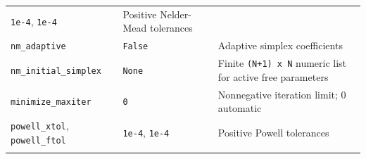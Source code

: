 \documentclass[
  10pt,
  a4paper,
  oneside]{scrreprt}
\begin{document}
\begin{longtable}[]{@{}lll@{}}
\begin{minipage}[t]{0.30\columnwidth}
\texttt{1e-4}, \texttt{1e-4}\strut
\end{minipage} & \begin{minipage}[t]{0.30\columnwidth}\raggedright
Positive Nelder-Mead tolerances\strut
\end{minipage}\tabularnewline
\begin{minipage}[t]{0.30\columnwidth}\raggedright
\texttt{nm\_adaptive}\strut
\end{minipage} & \begin{minipage}[t]{0.30\columnwidth}\raggedright
\texttt{False}\strut
\end{minipage} & \begin{minipage}[t]{0.30\columnwidth}\raggedright
Adaptive simplex coefficients\strut
\end{minipage}\tabularnewline
\begin{minipage}[t]{0.30\columnwidth}\raggedright
\texttt{nm\_initial\_simplex}\strut
\end{minipage} & \begin{minipage}[t]{0.30\columnwidth}\raggedright
\texttt{None}\strut
\end{minipage} & \begin{minipage}[t]{0.30\columnwidth}\raggedright
Finite \texttt{(N+1)\ x\ N} numeric list for active free
parameters\strut
\end{minipage}\tabularnewline
\begin{minipage}[t]{0.30\columnwidth}\raggedright
\texttt{minimize\_maxiter}\strut
\end{minipage} & \begin{minipage}[t]{0.30\columnwidth}\raggedright
\texttt{0}\strut
\end{minipage} & \begin{minipage}[t]{0.30\columnwidth}\raggedright
Nonnegative iteration limit; 0 automatic\strut
\end{minipage}\tabularnewline
\begin{minipage}[t]{0.30\columnwidth}\raggedright
\texttt{powell\_xtol}, \texttt{powell\_ftol}\strut
\end{minipage} & \begin{minipage}[t]{0.30\columnwidth}\raggedright
\texttt{1e-4}, \texttt{1e-4}\strut
\end{minipage} & \begin{minipage}[t]{0.30\columnwidth}\raggedright
Positive Powell tolerances\strut
\end{minipage}\tabularnewline
\begin{minipage}[t]{0.30\columnwidth}\raggedright

\end{minipage}
\end{longtable}
\end{document}
